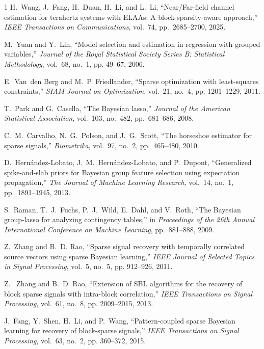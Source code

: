 \documentclass[lettersize,journal]{IEEEtran}
\theoremstyle{remark}
\begin{document}
\begin{thebibliography}{1}
	H.~Wang, J.~Fang, H.~Duan, H.~Li, and L.~Li,
	``Near/Far-field channel estimation for terahertz systems with ELAAs:
	A block-sparsity-aware approach,''
	\emph{IEEE Transactions on Communications},
	vol.~74, pp.~2685--2700, 2025.
	

M.~Yuan and Y.~Lin, ``Model selection and estimation in regression with grouped
variables,'' \emph{Journal of the Royal Statistical Society Series B:
	Statistical Methodology}, vol.~68, no.~1, pp. 49--67, 2006.

E.~Van~den Berg and M.~P. Friedlander, ``Sparse optimization with least-squares
constraints,'' \emph{SIAM Journal on Optimization}, vol.~21, no.~4, pp.
1201--1229, 2011.

T.~Park and G.~Casella,
``The Bayesian lasso,''
\emph{Journal of the American Statistical Association},
vol.~103, no.~482, pp.~681--686, 2008.


C.~M.~Carvalho, N.~G.~Polson, and J.~G.~Scott,
``The horseshoe estimator for sparse signals,''
\emph{Biometrika}, vol.~97, no.~2, pp.~465--480, 2010.


D.~Hern{\'a}ndez-Lobato, J.~M.~Hern{\'a}ndez-Lobato, and P.~Dupont,
``Generalized spike-and-slab priors for Bayesian group feature selection using expectation propagation,''
\emph{The Journal of Machine Learning Research}, vol.~14, no.~1,
pp.~1891--1945, 2013.

S.~Raman, T.~J.~Fuchs, P.~J.~Wild, E.~Dahl, and V.~Roth,
``The Bayesian group-lasso for analyzing contingency tables,''
in \emph{Proceedings of the 26th Annual International Conference on Machine Learning},
pp.~881--888, 2009.


Z.~Zhang and B.~D. Rao, ``Sparse signal recovery with temporally correlated
source vectors using sparse {Bayesian} learning,'' \emph{IEEE Journal of
	Selected Topics in Signal Processing}, vol.~5, no.~5, pp. 912--926, 2011.

Z.~\vspace{0mm} Zhang and B.~D. Rao, ``Extension of {SBL} algorithms for the
recovery of block sparse signals with intra-block correlation,'' \emph{IEEE
	Transactions on Signal Processing}, vol.~61, no.~8, pp. 2009--2015, 2013.

J.~Fang, Y.~Shen, H.~Li, and P.~Wang, ``Pattern-coupled sparse Bayesian
learning for recovery of block-sparse signals,'' \emph{IEEE Transactions on
	Signal Processing}, vol.~63, no.~2, pp. 360--372, 2015.


\end{thebibliography}
\end{document}
